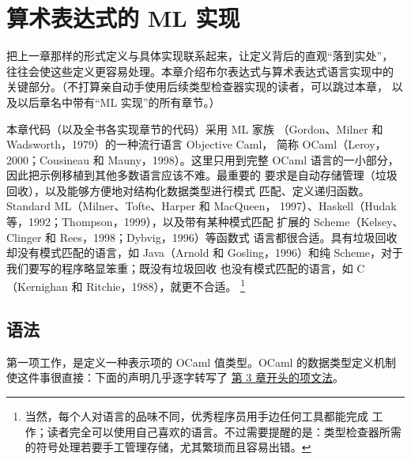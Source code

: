 
\chapter{算术表达式的 ML 实现}
\label{chap:4}

把上一章那样的形式定义与具体实现联系起来，让定义背后的直观“落到实处”，
往往会使这些定义更容易处理。本章介绍布尔表达式与算术表达式语言实现中的
关键部分。（不打算亲自动手使用后续类型检查器实现的读者，可以跳过本章，
以及以后章名中带有“ML 实现”的所有章节。）

本章代码（以及全书各实现章节的代码）采用 ML 家族
（Gordon、Milner 和 Wadsworth，1979）的一种流行语言 Objective Caml，
简称 OCaml（Leroy，2000；Cousineau 和 Mauny，1998）。这里只用到完整
OCaml 语言的一小部分，因此把示例移植到其他多数语言应该不难。最重要的
要求是自动存储管理（垃圾回收），以及能够方便地对结构化数据类型进行模式
匹配、定义递归函数。Standard ML（Milner、Tofte、Harper 和 MacQueen，
1997）、Haskell（Hudak 等，1992；Thompson，1999），以及带有某种模式匹配
扩展的 Scheme（Kelsey、Clinger 和 Rees，1998；Dybvig，1996）等函数式
语言都很合适。具有垃圾回收却没有模式匹配的语言，如 Java（Arnold 和
Gosling，1996）和纯 Scheme，对于我们要写的程序略显笨重；既没有垃圾回收
也没有模式匹配的语言，如 C（Kernighan 和 Ritchie，1988），就更不合适。
\footnote{当然，每个人对语言的品味不同，优秀程序员用手边任何工具都能完成
工作；读者完全可以使用自己喜欢的语言。不过需要提醒的是：类型检查器所需
的符号处理若要手工管理存储，尤其繁琐而且容易出错。}



\section{语法}
\label{sec:4.1}

第一项工作，是定义一种表示项的 OCaml 值类型。OCaml 的数据类型定义机制
使这件事很直接：下面的声明几乎逐字转写了
\hyperref[grammar:3.1-terms]{第 3 章开头的项文法}。

